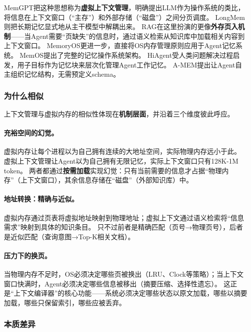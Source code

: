 MemGPT把这种思想称为\textbf{虚拟上下文管理}，明确提出LLM作为操作系统的类比，将信息在上下文窗口（``主存''）和外部存储（``磁盘''）之间分页调度\cite{memgpt2023}。
LongMem则把长期记忆显式地从主干模型中解耦出来\cite{longmem2023}。
RAG在这里扮演的更像\textbf{外存页入机制}——当Agent需要``页缺失''的信息时，通过语义检索从知识库中加载相关内容到上下文窗口\cite{lewis2020rag}。
MemoryOS更进一步，直接将OS内存管理原则应用于Agent记忆系统\cite{memoryos2025}。
MemOS提出了完整的记忆操作系统架构\cite{memos2025}。
HiAgent受人类问题解决过程启发，用子目标作为记忆块来层次化管理Agent工作记忆\cite{hiagent2024}。
A-MEM提出让Agent自主组织记忆结构，无需预定义schema\cite{amem2025}。

\subsubsection{为什么相似}

上下文管理与虚拟内存的相似性体现在\textbf{机制层面}，并沿着三个维度彼此呼应。

\paragraph{充裕空间的幻觉。}
虚拟内存让每个进程以为自己拥有连续的大地址空间，实际物理内存远小于此。
虚拟上下文管理让Agent以为自己拥有无限记忆，实际上下文窗口只有128K-1M token。
两者都通过\textbf{按需加载}实现幻觉：只有当前需要的信息才占据``物理内存''（上下文窗口），其余信息存储在``磁盘''（外部知识库）中。

\paragraph{地址转换：精确与近似。}
虚拟内存通过页表将虚拟地址映射到物理地址；虚拟上下文通过语义检索将``信息需求''映射到具体的知识条目。
只不过前者是精确匹配（页号→物理页号），后者是近似匹配（查询意图→Top-K相关文档）。

\paragraph{压力下的换页。}
当物理内存不足时，OS必须决定哪些页被换出（LRU、Clock等策略）；当上下文窗口快满时，Agent必须决定哪些信息被移出（摘要压缩、选择性遗忘）。
这正是``上下文编译器''的核心功能——系统必须决定哪些状态以原文加载，哪些以摘要加载，哪些只保留索引，哪些应被丢弃\cite{contextcompiler2025}。

\subsubsection{本质差异}

